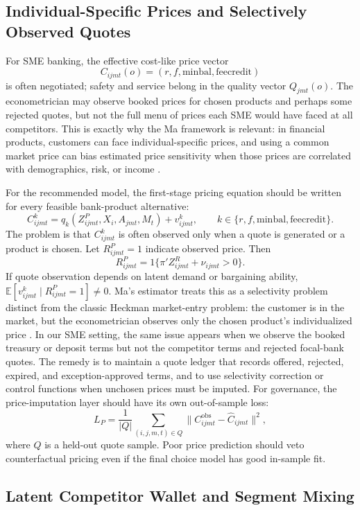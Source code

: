 \documentclass[11pt]{article}
\begin{document}
\subsection{Individual-Specific Prices and Selectively Observed Quotes}

For SME banking, the effective cost-like price vector
\[
  C_{ijmt}(o)
  =
  (r,f,\mathrm{minbal},\mathrm{feecredit})
\]
is often negotiated; safety and service belong in the quality vector
$Q_{jmt}(o)$. The econometrician may observe booked prices for chosen products
and perhaps some rejected quotes, but not the full menu of prices each SME
would have faced at all competitors. This is exactly why the Ma framework is
relevant: in financial products, customers can face individual-specific prices,
and using a common market price can bias estimated price sensitivity when those
prices are correlated with demographics, risk, or income
\citep{ma2024discrete}.

For the recommended model, the first-stage pricing equation should be written
for every feasible bank-product alternative:
\[
  C_{ijmt}^{k}
  =
  q_k(Z_{ijmt}^{P},X_i,A_{jmt},M_t)+v_{ijmt}^{k},
  \qquad
  k\in\{r,f,\mathrm{minbal},\mathrm{feecredit}\}.
\]
The problem is that $C_{ijmt}^{k}$ is often observed only when a quote is
generated or a product is chosen. Let $R_{ijmt}^{P}=1$ indicate observed price.
Then
\[
  R_{ijmt}^{P}
  =
  1\{\pi'Z_{ijmt}^{R}+\nu_{ijmt}>0\}.
\]
If quote observation depends on latent demand or bargaining ability,
$\mathbb{E}[v_{ijmt}^{k}\mid R_{ijmt}^{P}=1]\neq0$. Ma's estimator treats this
as a selectivity problem distinct from the classic Heckman market-entry problem:
the customer is in the market, but the econometrician observes only the chosen
product's individualized price \citep{heckman1979selection,ma2024discrete}. In
our SME setting, the same issue appears when we observe the booked treasury or
deposit terms but not the competitor terms and rejected focal-bank quotes. The
remedy is to maintain a quote ledger that records offered, rejected, expired,
and exception-approved terms, and to use selectivity correction or control
functions when unchosen prices must be imputed. For governance, the
price-imputation layer should have its own out-of-sample loss:
\[
  L_P
  =
  \frac{1}{|Q|}
  \sum_{(i,j,m,t)\in Q}
  \|C_{ijmt}^{\mathrm{obs}}-\widehat{C}_{ijmt}\|^2,
\]
where $Q$ is a held-out quote sample. Poor price prediction should veto
counterfactual pricing even if the final choice model has good in-sample fit.

\subsection{Latent Competitor Wallet and Segment Mixing}
\end{document}
